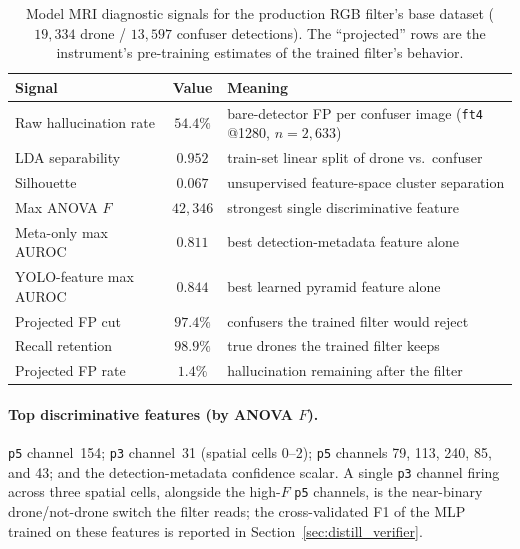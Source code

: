 \begin{table}[htbp]
    \centering
    \caption{Model MRI diagnostic signals for the production RGB filter's base dataset ($19{,}334$ drone / $13{,}597$ confuser detections). The ``projected'' rows are the instrument's pre-training estimates of the trained filter's behavior.}
    \label{tab:mri_signals}
    \begin{tabular}{l c p{}}
        \toprule
        Signal & Value & Meaning \\
        \midrule
        Raw hallucination rate & $54.4\%$ & bare-detector FP per confuser image (\texttt{ft4} @1280, $n{=}2{,}633$) \\
        LDA separability & $0.952$ & train-set linear split of drone vs.\ confuser \\
        Silhouette & $0.067$ & unsupervised feature-space cluster separation \\
        Max ANOVA $F$ & $42{,}346$ & strongest single discriminative feature \\
        Meta-only max AUROC & $0.811$ & best detection-metadata feature alone \\
        YOLO-feature max AUROC & $0.844$ & best learned pyramid feature alone \\
        Projected FP cut & $97.4\%$ & confusers the trained filter would reject \\
        Recall retention & $98.9\%$ & true drones the trained filter keeps \\
        Projected FP rate & $1.4\%$ & hallucination remaining after the filter \\
        \bottomrule
    \end{tabular}
\end{table}

\paragraph{Top discriminative features (by ANOVA $F$).} \texttt{p5} channel~154; \texttt{p3} channel~31 (spatial cells 0--2); \texttt{p5} channels 79, 113, 240, 85, and 43; and the detection-metadata confidence scalar. A single \texttt{p3} channel firing across three spatial cells, alongside the high-$F$ \texttt{p5} channels, is the near-binary drone/not-drone switch the filter reads; the cross-validated F1 of the MLP trained on these features is reported in Section~\ref{sec:distill_verifier}.

